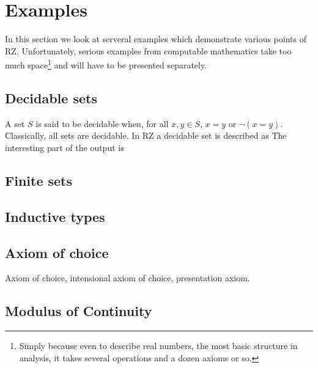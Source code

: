\section{Examples}
\label{sec:examples}

In this section we look at serveral examples which demonstrate various
points of RZ. Unfortunately, serious examples from computable
mathematics take too much space\footnote{Simply because even to
  describe real numbers, the most basic structure in analysis, it
  takes several operations and a dozen axioms or so.} and will have to
be presented separately.

\subsection{Decidable sets}
\label{sec:decidable-sets}

A set $S$ is said to be decidable when, for all $x, y \in S$, $x = y$
or $\lnot (x = y)$. Classically, all sets are decidable. In RZ a
decidable set is described as
%
%
The interesting part of the output is
%

\subsection{Finite sets}
\label{sec:finite-sets}


\subsection{Inductive types}
\label{sec:inductive-types}



\subsection{Axiom of choice}
\label{sec:axiom-choice}

Axiom of choice, intensional axiom of choice, presentation axiom.


\subsection{Modulus of Continuity}
\label{sec:we-show-modulus-of-continuity-example}

